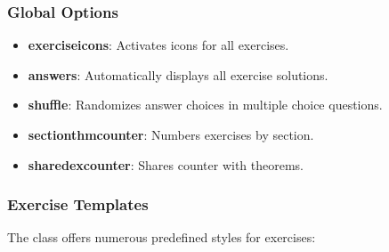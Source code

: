 \documentclass[
    margin=2cm
]{neoschool}
\begin{document}
\subsubsection{Global Options}

\begin{itemize}
\item
  \textbf{exerciseicons}: Activates icons for all exercises.
\item
  \textbf{answers}: Automatically displays all exercise solutions.
\item
  \textbf{shuffle}: Randomizes answer choices in multiple choice
  questions.
\item
  \textbf{sectionthmcounter}: Numbers exercises by section.
\item
  \textbf{sharedexcounter}: Shares counter with theorems.
\end{itemize}

\subsubsection{Exercise Templates}

The class offers numerous predefined styles for exercises:
\end{document}
